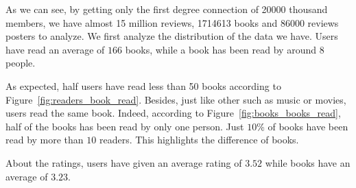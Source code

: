 \documentclass[11pt]{article}
\begin{document}

As we can see, by getting only the first degree connection of 20000 thousand members, we have almost 15 million reviews, 1714613 books and 86000 reviews posters to analyze.
We first analyze the distribution of the data we have.
Users have read an average of $166$ books, while a book has been read by around $8$ people. 

As expected, half users have read less than 50 books according to Figure~\ref{fig:readers_book_read}. Besides, just like other such as music or movies, users read the same book. Indeed, according to Figure~\ref{fig:books_books_read}, half of the books has been read by only one person. Just $10$\% of books have been read by more than $10$ readers. This highlights the difference of books.

About the ratings, users have given an average rating of $3.52$ while books have an average of $3.23$. 


\end{document}
